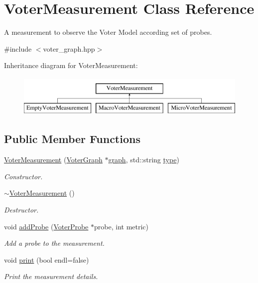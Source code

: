 \hypertarget{class_voter_measurement}{}\section{Voter\+Measurement Class Reference}
\label{class_voter_measurement}


A measurement to observe the Voter Model according set of probes.  




{\ttfamily \#include $<$voter\+\_\+graph.\+hpp$>$}

Inheritance diagram for Voter\+Measurement\+:\begin{figure}[H]
\begin{center}
\leavevmode
\includegraphics[height=2.000000cm]{class_voter_measurement}
\end{center}
\end{figure}
\subsection*{Public Member Functions}
\begin{DoxyCompactItemize}
\item 
\hyperlink{class_voter_measurement_a0668249876e48af0ae246a554b30195c}{Voter\+Measurement} (\hyperlink{class_voter_graph}{Voter\+Graph} $\ast$\hyperlink{class_voter_measurement_a8d22d4b78f7e2f4c747f5716c4885351}{graph}, std\+::string \hyperlink{class_voter_measurement_ad4471a133827f052622a84c4a451aabe}{type})
\begin{DoxyCompactList}\small\item\em Constructor. \end{DoxyCompactList}\item 
\hypertarget{class_voter_measurement_a2cbd2d015fad1579c21dc62dd2511fe6}{}\hyperlink{class_voter_measurement_a2cbd2d015fad1579c21dc62dd2511fe6}{$\sim$\+Voter\+Measurement} ()\label{class_voter_measurement_a2cbd2d015fad1579c21dc62dd2511fe6}

\begin{DoxyCompactList}\small\item\em Destructor. \end{DoxyCompactList}\item 
void \hyperlink{class_voter_measurement_a75f0daed0375419a9aea7c57445a8d41}{add\+Probe} (\hyperlink{class_voter_probe}{Voter\+Probe} $\ast$probe, int metric)
\begin{DoxyCompactList}\small\item\em Add a probe to the measurement. \end{DoxyCompactList}\item 
void \hyperlink{class_voter_measurement_a9164cbbbf69d83a6ca5d8cda0951dcd5}{print} (bool endl=false)
\begin{DoxyCompactList}\small\item\em Print the measurement details. \end{DoxyCompactList}\end{DoxyCompactItemize}

